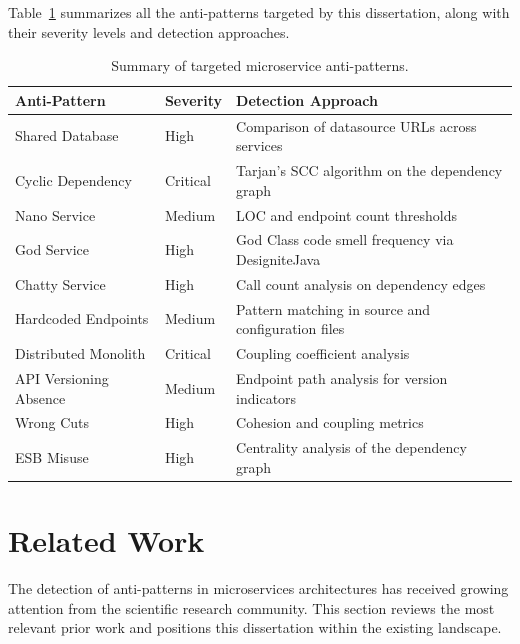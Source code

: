 Table~\ref{tab:anti-patterns-summary} summarizes all the anti-patterns targeted by this dissertation, along with their severity levels and detection approaches.

\begin{table}[!ht]
    \begin{center}
        \begin{tabular}{|l|l|p{180pt}|}
            \hline
            \textbf{Anti-Pattern} & \textbf{Severity} & \textbf{Detection Approach} \\
            \hline\hline
            Shared Database & High & Comparison of datasource URLs across services \\
            \hline
            Cyclic Dependency & Critical & Tarjan's SCC algorithm on the dependency graph \\
            \hline
            Nano Service & Medium & LOC and endpoint count thresholds \\
            \hline
            God Service & High & God Class code smell frequency via DesigniteJava \\
            \hline
            Chatty Service & High & Call count analysis on dependency edges \\
            \hline
            Hardcoded Endpoints & Medium & Pattern matching in source and configuration files \\
            \hline
            Distributed Monolith & Critical & Coupling coefficient analysis \\
            \hline
            API Versioning Absence & Medium & Endpoint path analysis for version indicators \\
            \hline
            Wrong Cuts & High & Cohesion and coupling metrics \\
            \hline
            ESB Misuse & High & Centrality analysis of the dependency graph \\
            \hline
        \end{tabular}
    \end{center}
    \caption{Summary of targeted microservice anti-patterns.}
    \label{tab:anti-patterns-summary}
\end{table}

\section{Related Work}
\label{sec:related-work}

\par The detection of anti-patterns in microservices architectures has received growing attention from the scientific research community. This section reviews the most relevant prior work and positions this dissertation within the existing landscape.

